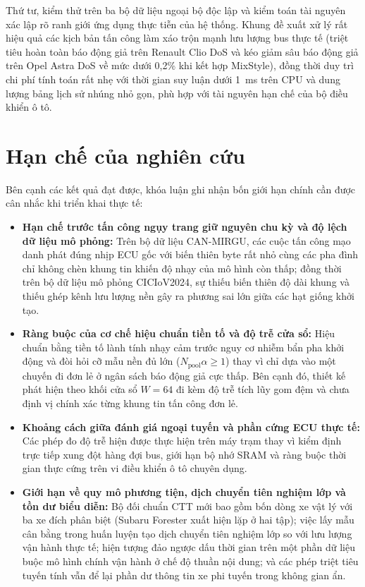 \documentclass[12pt, a4paper, reqno, oneside]{book}
\newcommand\sect[1]{%
  \Needspace{5\baselineskip}%
  \phantomsection%
  \addcontentsline{toc}{section}{#1}%
  \section*{#1}%
}
\begin{document}
Thứ tư, kiểm thử trên ba bộ dữ liệu ngoại bộ độc lập và kiểm toán tài nguyên xác lập rõ ranh giới ứng dụng thực tiễn của hệ thống. Khung đề xuất xử lý rất hiệu quả các kịch bản tấn công làm xáo trộn mạnh lưu lượng bus thực tế (triệt tiêu hoàn toàn báo động giả trên Renault Clio DoS và kéo giảm sâu báo động giả trên Opel Astra DoS về mức dưới 0,2\% khi kết hợp MixStyle), đồng thời duy trì chi phí tính toán rất nhẹ với thời gian suy luận dưới 1~ms trên CPU và dung lượng bảng lịch sử nhúng nhỏ gọn, phù hợp với tài nguyên hạn chế của bộ điều khiển ô tô.

\sect{Hạn chế của nghiên cứu}

Bên cạnh các kết quả đạt được, khóa luận ghi nhận bốn giới hạn chính cần được cân nhắc khi triển khai thực tế:
\begin{itemize}
  \item \textbf{Hạn chế trước tấn công ngụy trang giữ nguyên chu kỳ và độ lệch dữ liệu mô phỏng:} Trên bộ dữ liệu CAN-MIRGU, các cuộc tấn công mạo danh phát đúng nhịp ECU gốc với biến thiên byte rất nhỏ cùng các pha đình chỉ không chèn khung tin khiến độ nhạy của mô hình còn thấp; đồng thời trên bộ dữ liệu mô phỏng CICIoV2024, sự thiếu biến thiên độ dài khung và thiếu ghép kênh lưu lượng nền gây ra phương sai lớn giữa các hạt giống khởi tạo.
  \item \textbf{Ràng buộc của cơ chế hiệu chuẩn tiền tố và độ trễ cửa sổ:} Hiệu chuẩn bằng tiền tố lành tính nhạy cảm trước nguy cơ nhiễm bẩn pha khởi động và đòi hỏi cỡ mẫu nền đủ lớn ($N_{\text{pool}}\alpha \ge 1$) thay vì chỉ dựa vào một chuyến đi đơn lẻ ở ngân sách báo động giả cực thấp. Bên cạnh đó, thiết kế phát hiện theo khối cửa sổ $W=64$ đi kèm độ trễ tích lũy gom đệm và chưa định vị chính xác từng khung tin tấn công đơn lẻ.
  \item \textbf{Khoảng cách giữa đánh giá ngoại tuyến và phần cứng ECU thực tế:} Các phép đo độ trễ hiện được thực hiện trên máy trạm thay vì kiểm định trực tiếp xung đột hàng đợi bus, giới hạn bộ nhớ SRAM và ràng buộc thời gian thực cứng trên vi điều khiển ô tô chuyên dụng.
  \item \textbf{Giới hạn về quy mô phương tiện, dịch chuyển tiên nghiệm lớp và tồn dư biểu diễn:} Bộ đối chuẩn CTT mới bao gồm bốn dòng xe vật lý với ba xe đích phân biệt (Subaru Forester xuất hiện lặp ở hai tập); việc lấy mẫu cân bằng trong huấn luyện tạo dịch chuyển tiên nghiệm lớp so với lưu lượng vận hành thực tế; hiện tượng đảo ngược dấu thời gian trên một phần dữ liệu buộc mô hình chính vận hành ở chế độ thuần nội dung; và các phép triệt tiêu tuyến tính vẫn để lại phần dư thông tin xe phi tuyến trong không gian ẩn.
\end{itemize}
\end{document}
